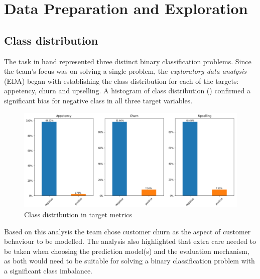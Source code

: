 \documentclass{article}
\begin{document}
\section{Data Preparation and Exploration}
\subsection{Class distribution}
The task in hand represented three distinct binary classification problems. 
Since the team's focus was on solving a single problem, the \emph{exploratory data analysis} (EDA) began with establishing the class distribution for each of the targets: appetency, churn and upselling.
A histogram of class distribution () confirmed a significant bias for negative class in all three target variables. 

\begin{figure}[htbp]
\vskip 5mm
\begin{center}
\centerline{\includegraphics[width=5in]{graph/Class_distribution.PNG}}
\caption{Class distribution in target metrics}
\label{fig:cla_dist}
\end{center}
\vskip -5mm
\end{figure} 

Based on this analysis the team chose customer churn as the aspect of customer behaviour to be modelled.
The analysis also highlighted that extra care needed to be taken when choosing the prediction model(s) and the evaluation mechanism, as both would need to be suitable for solving a binary classification problem with a significant class imbalance. 
\end{document}
